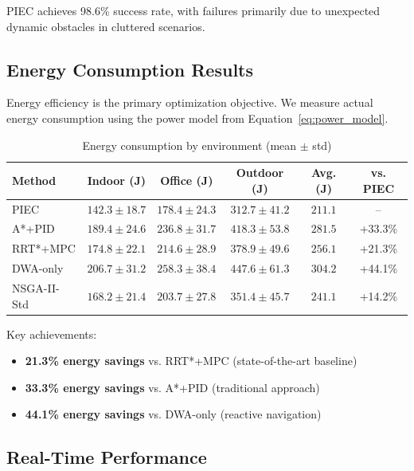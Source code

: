 PIEC achieves 98.6\% success rate, with failures primarily due to unexpected dynamic obstacles in cluttered scenarios.

\subsection{Energy Consumption Results}

Energy efficiency is the primary optimization objective. We measure actual energy consumption using the power model from Equation~\ref{eq:power_model}.

\begin{table}[htbp]
\centering
\caption{Energy consumption by environment (mean $\pm$ std)}
\label{tab:energy_consumption}
\begin{tabular}{lccccc}
\toprule
\textbf{Method} & \textbf{Indoor (J)} & \textbf{Office (J)} & \textbf{Outdoor (J)} & \textbf{Avg. (J)} & \textbf{vs. PIEC} \\
\midrule
PIEC & $\mathbf{142.3 \pm 18.7}$ & $\mathbf{178.4 \pm 24.3}$ & $\mathbf{312.7 \pm 41.2}$ & $\mathbf{211.1}$ & -- \\
A*+PID & $189.4 \pm 24.6$ & $236.8 \pm 31.7$ & $418.3 \pm 53.8$ & $281.5$ & +33.3\% \\
RRT*+MPC & $174.8 \pm 22.1$ & $214.6 \pm 28.9$ & $378.9 \pm 49.6$ & $256.1$ & +21.3\% \\
DWA-only & $206.7 \pm 31.2$ & $258.3 \pm 38.4$ & $447.6 \pm 61.3$ & $304.2$ & +44.1\% \\
NSGA-II-Std & $168.2 \pm 21.4$ & $203.7 \pm 27.8$ & $351.4 \pm 45.7$ & $241.1$ & +14.2\% \\
\bottomrule
\end{tabular}
\end{table}

Key achievements:
\begin{itemize}
    \item \textbf{21.3\% energy savings} vs. RRT*+MPC (state-of-the-art baseline)
    \item \textbf{33.3\% energy savings} vs. A*+PID (traditional approach)
    \item \textbf{44.1\% energy savings} vs. DWA-only (reactive navigation)
\end{itemize}


\subsection{Real-Time Performance}

